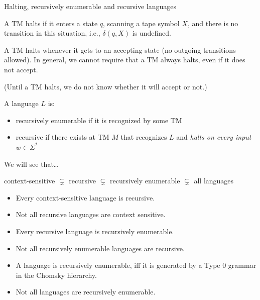 \documentclass[handout]{beamer}
\begin{document}
\begin{frame}{Halting, recursively enumerable and recursive languages}
        
    \begin{definition}
        A TM \alert{halts} if it enters a state $q$, scanning a tape symbol $X$, and there is no transition in this situation, i.e., $\delta(q,X)$ is undefined.
    \end{definition}

    A TM halts whenever it gets to an accepting state (no outgoing transitions allowed). In general, we cannot require that a TM always halts, even if it does not accept.

    (Until a TM halts, we  do not know whether it will accept or not.)

    \smallskip

    \begin{definition}
        A language $L$ is:
        \begin{itemize}
            \item \alert{recursively enumerable} if it is recognized by some TM
            \item \alert{recursive} if there exists at TM $M$ that recognizes $L$ and \emph{halts on every input} $w\in\Sigma^*$
        \end{itemize}
    \end{definition}
  
\end{frame}


\begin{frame}{We will see that\dots}

    \begin{center}
        \Large
        context-sensitive $\subsetneq$ recursive $\subsetneq$ recursively enumerable $\subsetneq$ all languages
    \end{center}


    \begin{itemize}
        \item Every context-sensitive language is recursive.
        \item Not all recursive languages are context sensitive.
        \item Every recursive language is recursively enumerable.
        \item Not all recursively enumerable languages are recursive.
        \item A language is recursively enumerable, iff it is generated by a Type 0 grammar in the Chomsky hierarchy.
        \item Not all languages are recursively enumerable.   
    \end{itemize}

\end{frame}
\end{document}
